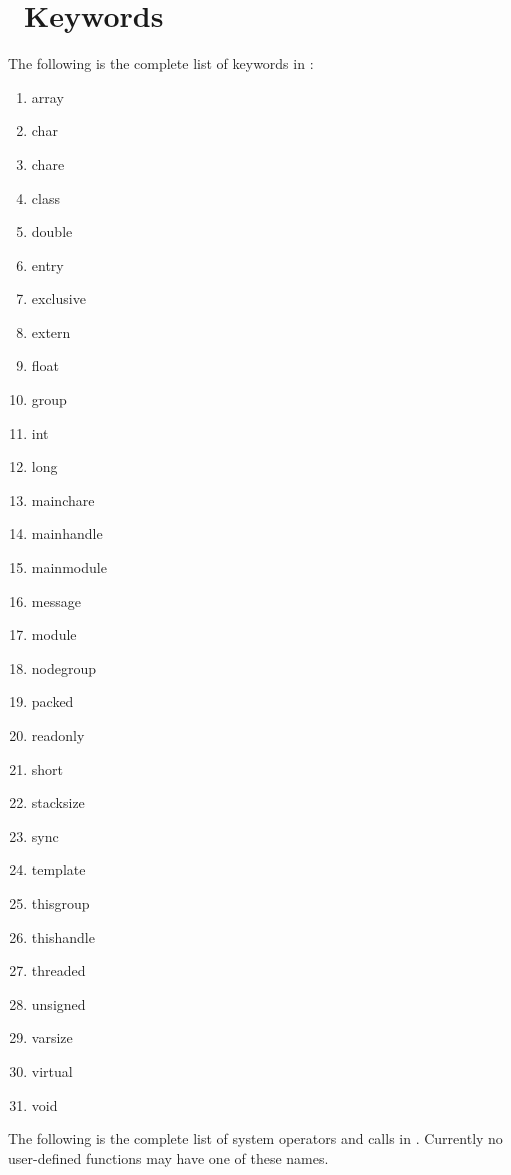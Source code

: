 \section{\charmpp\ Keywords}
The following is the complete list of keywords in \charmpp:

\begin{enumerate}
\item array
\item char
\item chare
\item class
\item double
\item entry
\item exclusive
\item extern
\item float
\item group
\item int
\item long
\item mainchare
\item mainhandle
\item mainmodule
\item message
\item module
\item nodegroup
\item packed
\item readonly
\item short
\item stacksize
\item sync 
\item template
\item thisgroup
\item thishandle
\item threaded
\item unsigned 
\item varsize
\item virtual
\item void
\end{enumerate}

The following is the complete list of system operators and calls in \charmpp.
Currently no user-defined functions may have one of these names.

